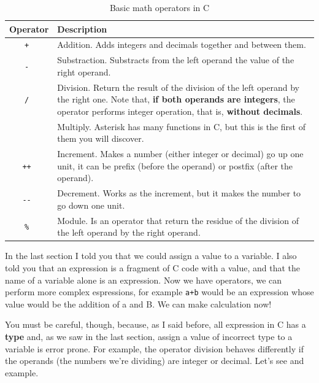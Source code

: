 \documentclass[a4paper]{article}
\begin{document}
\begin{table}[H]
\centering
\begin{tabularx}{\linewidth}{|c|Y|}
\hline
\bf Operator & \bf Description \\ \hline
\tt + & Addition. Adds integers and decimals together and between them. \\\hline
\tt - & Substraction. Substracts from the left operand the value of the right operand. \\\hline
\tt / & Division. Return the result of the division of the left operand by the right one. Note that, \textbf{if both operands are integers}, the operator performs integer operation, that is, \textbf{without decimals}. \\\hline
\tt * & Multiply. Asterisk has many functions in C, but this is the first of them you will discover. \\\hline
\tt ++ & Increment. Makes a number (either integer or decimal) go up one unit, it can be prefix (before the operand) or postfix (after the operand).\\\hline
\tt -{}- & Decrement. Works as the increment, but it makes the number to go down one unit. \\\hline
\tt \% & Module. Is an operator that return the residue of the division of the left operand by the right operand. \\\hline
\end{tabularx}
\caption{Basic math operators in C}
\label{tab:mathOperators}
\end{table}

In the last section I told you that we could assign a value to a variable.
I also told you that an expression is a fragment of C code with a value, and
that the name of a variable alone is an expression. Now we have operators, we
can perform more complex espressions, for example \verb!a+b! would be an
expression whose value would be the addition of a and B.
We can make calculation now!


You must be careful, though, because, as I said before, all expression in C has
a \textbf{type} and, as we saw in the last section, assign a value of
incorrect type to a variable is error prone. For example, the operator division
behaves differently if the operands (the numbers we're dividing) are integer or
decimal. Let's see and example.
\end{document}
